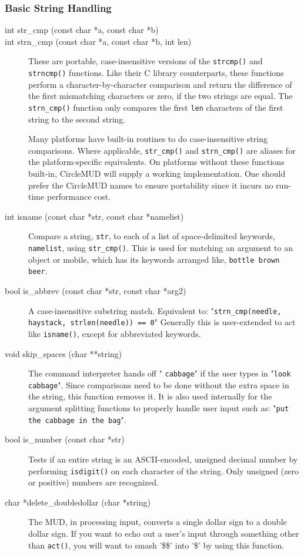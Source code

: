 \documentclass[11pt]{article}
\begin{document}
\subsubsection{Basic String Handling}

\begin{description}
\item[int str\_cmp (const char *a, const char *b)]
\item[int strn\_cmp (const char *a, const char *b, int len)]
These are portable, case-insensitive versions of the \texttt{strcmp()} and \texttt{strncmp()} functions.  Like their C library counterparts, these functions perform a character-by-character comparison and return the difference of the first mismatching characters or zero, if the two strings are equal.  The \texttt{strn\_cmp()} function only compares the first \texttt{len} characters of the first string to the second string.
\par
Many platforms have built-in routines to do case-insensitive string comparisons.  Where applicable, \texttt{str\_cmp()} and \texttt{strn\_cmp()} are aliases for the platform-specific equivalents.  On platforms without these functions built-in, CircleMUD will supply a working implementation. One should prefer the CircleMUD names to ensure portability since it incurs no run-time performance cost.
\item[int isname (const char *str, const char *namelist)]
Compare a string, \texttt{str}, to each of a list of space-delimited keywords, \texttt{namelist}, using \texttt{str\_cmp()}.  This is used for matching an argument to an object or mobile, which has its keywords arranged like, \texttt{bottle brown beer}.
\item[bool is\_abbrev (const char *str, const char *arg2)]
A case-insensitive substring match. Equivalent to: "\texttt{strn\_cmp(needle, haystack, strlen(needle)) == 0}"  Generally this is user-extended to act like \texttt{isname()}, except for abbreviated keywords.
\item[void skip\_spaces (char **string)]
The command interpreter hands off " \texttt{cabbage}" if the user types in "\texttt{look cabbage}".  Since comparisons need to be done without the extra space in the string, this function removes it. It is also used internally for the argument splitting functions to properly handle user input such as: "\texttt{put    the      cabbage  in    the    bag}".
\item[bool is\_number (const char *str)]
Tests if an entire string is an ASCII-encoded, unsigned decimal number by performing \texttt{isdigit()} on each character of the string. Only unsigned (zero or positive) numbers are recognized.
\item[char *delete\_doubledollar (char *string)]
The MUD, in processing input, converts a single dollar sign to a double dollar sign.  If you want to echo out a user's input through something other than \texttt{act()}, you will want to smash '\$\$' into '\$' by using this function.
\end{description}
\end{document}
